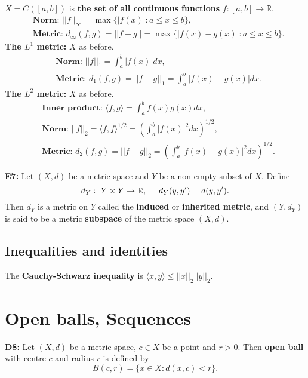 \documentclass[twocolumn,10pt]{article}
\begin{document}
$X=C([a,b])$ is \textbf{the set of all continuous functions} $f:[a,b]\to\mathbb{R}$.
\begin{align*}
    &\textbf{Norm: } ||f||_{\infty} = \max\{|f(x)| : a\leq x\leq b\},\\
    &\textbf{Metric: } d_{\infty}(f,g) = ||f-g|| = \max\{|f(x)-g(x)| : a\leq x\leq b\}.
\end{align*}
\textbf{The $L^1$ metric:} $X$ as before.
\begin{align*}
    &\textbf{Norm: } ||f||_1 = \int_a^b |f(x)| dx,\\
    &\textbf{Metric: } d_1(f,g) = ||f-g||_1 = \int_a^b|f(x)-g(x)| dx.
\end{align*}
\textbf{The $L^2$ metric:} $X$ as before.
\begin{align*}
    &\textbf{Inner product: } \langle f,g\rangle = \int_a^b f(x)g(x) dx,\\
    &\textbf{Norm: } ||f||_2 = \langle f,f\rangle^{1/2} = \left(\int_a^b|f(x)|^2dx\right)^{1/2},\\
    &\textbf{Metric: } d_2(f,g) = ||f-g||_2 = \left(\int_a^b|f(x)-g(x)|^2dx\right)^{1/2}.
\end{align*}

\textbf{E7:} Let $(X,d)$ be a metric space and $Y$ be a non-empty subset of $X$. Define
\begin{equation*}
    d_Y: \text{ } Y\times Y\to\mathbb{R}, \hspace{0.5cm} d_Y(y,y')=d(y,y').
\end{equation*}
Then $d_Y$ is a metric on $Y$ called the \textbf{induced} or \textbf{inherited metric}, and $(Y,d_Y)$ is said to be a metric \textbf{subspace} of the metric space $(X,d)$.

\subsection*{Inequalities and identities}

The \textbf{Cauchy-Schwarz inequality} is $\langle x,y\rangle\leq||x||_2||y||_2$.

\section{Open balls, Sequences}

\textbf{D8:} Let $(X,d)$ be a metric space, $c\in X$ be a point and $r>0$. Then \textbf{open ball} with centre $c$ and radius $r$ is defined by
\begin{equation*}
    B(c,r) = \{x\in X : d(x,c) < r\}.
\end{equation*}
\end{document}
